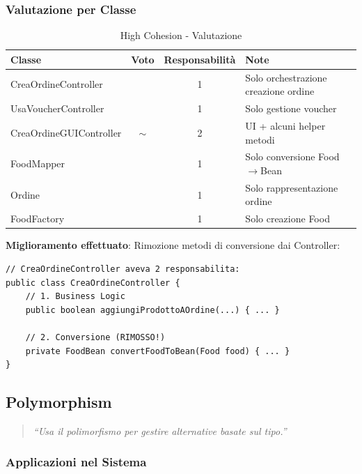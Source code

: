 \documentclass[12pt,a4paper]{article}
\newcommand{\ok}{\textcolor{okgreen}{\checkmark}}
\newcommand{\warn}{\textcolor{warnOrange}{$\sim$}}
\begin{document}
\subsubsection{Valutazione per Classe}

\begin{table}[h]
\centering
\begin{tabular}{|l|c|c|p{6cm}|}
\hline
\textbf{Classe} & \textbf{Voto} & \textbf{Responsabilità} & \textbf{Note} \\
\hline
CreaOrdineController & \ok & 1 & Solo orchestrazione creazione ordine \\
\hline
UsaVoucherController & \ok & 1 & Solo gestione voucher \\
\hline
CreaOrdineGUIController & \warn & 2 & UI + alcuni helper metodi \\
\hline
FoodMapper & \ok & 1 & Solo conversione Food$\to$Bean \\
\hline
Ordine & \ok & 1 & Solo rappresentazione ordine \\
\hline
FoodFactory & \ok & 1 & Solo creazione Food \\
\hline
\end{tabular}
\caption{High Cohesion - Valutazione}
\end{table}

\textbf{Miglioramento effettuato}: Rimozione metodi di conversione dai Controller:

\begin{lstlisting}[style=javastyle, caption={Prima: Bassa Coesione}]
// CreaOrdineController aveva 2 responsabilita:
public class CreaOrdineController {
    // 1. Business Logic
    public boolean aggiungiProdottoAOrdine(...) { ... }
    
    // 2. Conversione (RIMOSSO!)
    private FoodBean convertFoodToBean(Food food) { ... }
}
\end{lstlisting}

\subsection{Polymorphism}

\begin{quote}
\textit{``Usa il polimorfismo per gestire alternative basate sul tipo.''}
\end{quote}

\subsubsection{Applicazioni nel Sistema}
\end{document}
